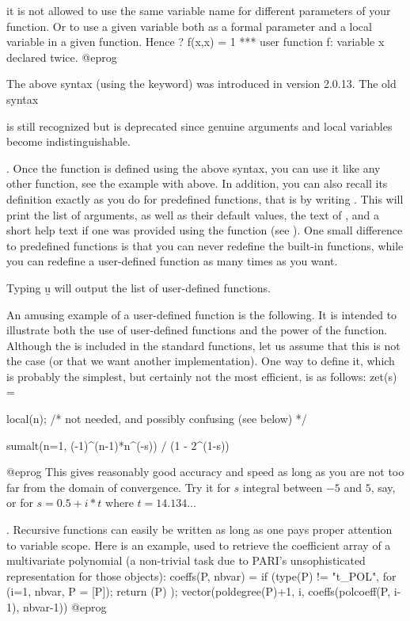  it is not allowed to use the same
variable name for different parameters of your function. Or to use a given
variable both as a formal parameter and a local variable in a given function.
Hence
\bprog
? f(x,x) = 1
  ***   user function f: variable x declared twice.
@eprog

 The above syntax (using the  keyword) was
introduced in version 2.0.13. The old syntax

%

\noindent is still recognized but is deprecated since genuine arguments and
local variables become indistinguishable.

. Once the function is defined using the above syntax, you can
use it like any other function, see the example with  above. In
addition, you can also recall its definition exactly as you do for predefined
functions, that is by writing . This will print the list of
arguments, as well as their default values, the text of , and a
short help text if one was provided using the  function (see
). One small difference to predefined functions is that
you can never redefine the built-in functions, while you can redefine a
user-defined function as many times as you want.

Typing \b{u} will output the list of user-defined functions.

An amusing example of a user-defined function is the following. It is
intended to illustrate both the use of user-defined functions and the power
of the  function. Although the  is
included in the standard functions, let us assume that this is not the case
(or that we want another implementation). One way to define it, which is
probably the simplest, but certainly not the most efficient, is as
follows:
\bprog
zet(s) =
{ local(n); /* not needed, and possibly confusing (see below) */

  sumalt(n=1, (-1)^(n-1)*n^(-s)) / (1 - 2^(1-s))
}
@eprog
\noindent This gives reasonably good accuracy and speed as long as you are
not too far from the domain of convergence. Try it for $s$ integral between
$-5$ and $5$, say, or for $s=0.5+i*t$ where $t=14.134\dots$

. Recursive functions can easily
be written as long as one pays proper attention to variable scope. Here is an
example, used to retrieve the coefficient array of a multivariate polynomial
(a non-trivial task due to PARI's unsophisticated representation for those
objects): 
\bprog
coeffs(P, nbvar) =
{
  if (type(P) != "t_POL",
    for (i=1, nbvar, P = [P]);
    return (P)
  );
  vector(poldegree(P)+1, i, coeffs(polcoeff(P, i-1), nbvar-1))
}
@eprog

